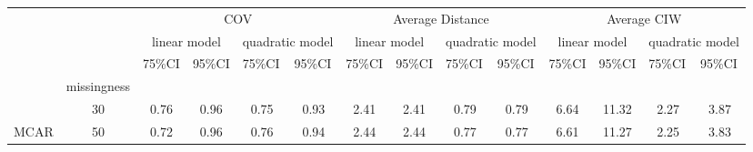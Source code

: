	\newpage
	\begin{table}
		\begin{tabular}{cc|cccc|cccc|cccc}
			\multicolumn{2}{l|}{}                             & \multicolumn{4}{c|}{COV}                                                                                           & \multicolumn{4}{c|}{Average Distance}                                                                              & \multicolumn{4}{c}{Average CIW}                                                                                   \\ \cline{3-14} 
			\multicolumn{1}{l}{}      & \multicolumn{1}{l|}{} & \multicolumn{2}{c}{linear model}                        & \multicolumn{2}{c|}{quadratic model}                     & \multicolumn{2}{c}{linear model}                        & \multicolumn{2}{c|}{quadratic model}                     & \multicolumn{2}{c}{linear model}                        & \multicolumn{2}{c}{quadratic model}                     \\ \hline
			\multicolumn{1}{l|}{}     & \multicolumn{1}{l|}{} & \multicolumn{1}{l}{75\%CI} & \multicolumn{1}{l}{95\%CI} & \multicolumn{1}{l}{75\%CI} & \multicolumn{1}{l|}{95\%CI} & \multicolumn{1}{l}{75\%CI} & \multicolumn{1}{l}{95\%CI} & \multicolumn{1}{l}{75\%CI} & \multicolumn{1}{l|}{95\%CI} & \multicolumn{1}{l}{75\%CI} & \multicolumn{1}{l}{95\%CI} & \multicolumn{1}{l}{75\%CI} & \multicolumn{1}{l}{95\%CI} \\
			\multicolumn{1}{c|}{}     & missingness           &                            &                            &                            &                             &                            &                            &                            &                             &                            &                            &                            &                            \\ \cline{2-14} 
			\multicolumn{1}{c|}{}     & 30                    & 0.76                       & 0.96                       & 0.75                       & 0.93                        & 2.41                       & 2.41                       & 0.79                       & 0.79                        & 6.64                       & 11.32                      & 2.27                       & 3.87                       \\
			\multicolumn{1}{c|}{MCAR} & 50                    & 0.72                       & 0.96                       & 0.76                       & 0.94                        & 2.44                       & 2.44                       & 0.77                       & 0.77                        & 6.61                       & 11.27                      & 2.25                       & 3.83                       \\

\end{tabular}
\end{table}
